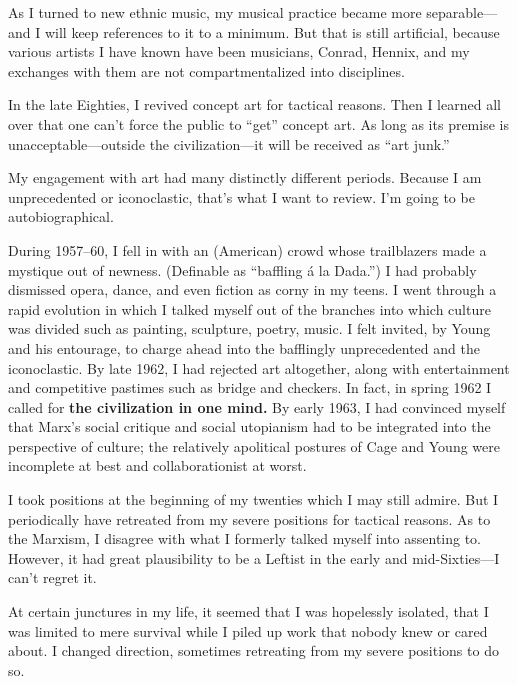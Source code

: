 As I turned to new ethnic music, my musical practice became more separable---and I will keep references to it to a minimum.  But that is still artificial, because various artists I have known have been musicians, Conrad, Hennix, and my exchanges with them are not compartmentalized into disciplines.

In the late Eighties, I revived concept art for tactical reasons.  Then I learned all over that one can't force the public to \enquote{get} concept art.  As long as its premise is unacceptable---outside the civilization---it will be received as \enquote{art junk.}

My engagement with art had many distinctly different periods.  Because I am unprecedented or iconoclastic, that's what I want to review.  I'm going to be autobiographical.

\Pb

During 1957--60, I fell in with an (American) crowd whose trailblazers made a mystique out of newness.  (Definable as \enquote{baffling \'{a} la Dada.})  I had probably dismissed opera, dance, and even fiction as corny in my teens.  I went through a rapid evolution in which I talked myself out of the branches into which culture was divided such as painting, sculpture, poetry, music.  I felt invited, by Young and his entourage, to charge ahead into the bafflingly unprecedented and the iconoclastic.  By late 1962, I had rejected art altogether, along with entertainment and competitive pastimes such as bridge and checkers.  In fact, in spring 1962 I called for \textbf{the civilization in one mind.}  By early 1963, I had convinced myself that Marx's social critique and social utopianism had to be integrated into the perspective of culture; the relatively apolitical postures of Cage and Young were incomplete at best and collaborationist at worst. 

\Pb

I took positions at the beginning of my twenties which I may still admire.  But I periodically have retreated from my severe positions for tactical reasons.  As to the Marxism, I disagree with what I formerly talked myself into assenting to.  However, it had great plausibility to be a Leftist in the early and mid-Sixties---I can't regret it.

At certain junctures in my life, it seemed that I was hopelessly isolated, that I was limited to mere survival while I piled up work that nobody knew or cared about.  I changed direction, sometimes retreating from my severe positions to do so. 

